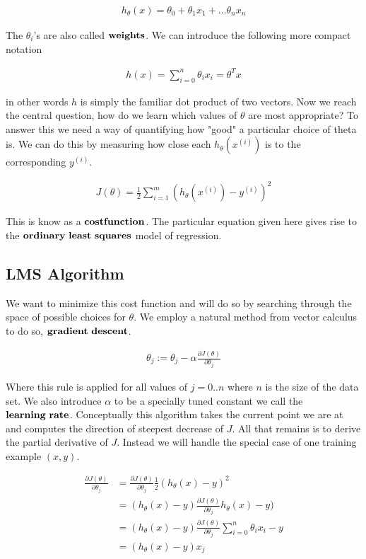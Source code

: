 \documentclass[11pt]{exam}
\newcommand{\idx}[2]{#1^{(#2)}}
\begin{document}
\begin{align*}
h_\theta (x) = \theta_0 + \theta_1x_1 + \dots \theta_nx_n
\end{align*}

The $\theta_i$'s are also called $\bf{weights}$. We can introduce the following more compact notation

\begin{align*}
h(x) = \sum_{i=0}^n \theta_ix_i = \theta^Tx
\end{align*}

in other words $h$ is simply the familiar dot product of two vectors. Now we reach the central question, how do we learn which values of $\theta$ are most appropriate? To answer this we need a way of quantifying how "good" a particular choice of theta is. We can do this by measuring how close each $h_\theta(\idx{x}{i})$ is to the corresponding $\idx{y}{i}$.

\begin{align*}
J(\theta) = \frac{1}{2}\sum_{i=1}^m(h_\theta(\idx{x}{i})-\idx{y}{i})^2
\end{align*}

This is know as a $\bf{cost function}$. The particular equation given here gives rise to the $\bf{ordinary \ least \ squares}$ model of regression.

\subsection{LMS Algorithm}

We want to minimize this cost function and will do so by searching through the space of possible choices for $\theta$. We employ a natural method from vector calculus to do so, $\bf{gradient \ descent}$.

\begin{align*}
\theta_j  := \theta_j - \alpha \frac{\partial J(\theta)}{\partial \theta_j}
\end{align*}

Where this rule is applied for all values of $j = 0 .. n$ where $n$ is the size of the data set. We also introduce $\alpha$ to be a specially tuned constant we call the $\bf{learning \ rate}$. Conceptually this algorithm takes the current point we are at and computes the direction of steepest decrease of $J$. All that remains is to derive the partial derivative of $J$. Instead we will handle the special case of one training example $(x,y)$.

\begin{align*}
\frac{\partial J(\theta)}{\partial \theta_j} &= \frac{\partial J(\theta)}{\partial \theta_j} \frac{1}{2} (h_\theta(x)-y)^2\\
&= (h_\theta(x)-y) \frac{\partial J(\theta)}{\partial \theta_j} h_\theta(x)-y)\\
&= (h_\theta(x)-y) \frac{\partial J(\theta)}{\partial \theta_j} \sum_{i=0}^n \theta_ix_i - y\\
&=  (h_\theta(x)-y)x_j\\
\end{align*} 
\end{document}
